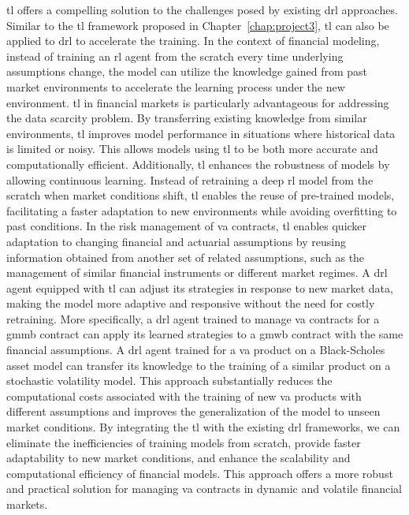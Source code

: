 \gls{tl} offers a compelling solution to the challenges posed by existing \gls{drl} approaches. 
Similar to the \gls{tl} framework proposed in Chapter~\ref{chap:project3}, \gls{tl} can also be applied to \gls{drl} to accelerate the training.
In the context of financial modeling, instead of training an \gls{rl} agent from the scratch every time underlying assumptions change, the model can utilize the knowledge gained from past market environments to accelerate the learning process under the new environment.
\gls{tl} in financial markets is particularly advantageous for addressing the data scarcity problem. 
By transferring existing knowledge from similar environments, \gls{tl} improves model performance in situations where historical data is limited or noisy. 
This allows models using \gls{tl} to be both more accurate and computationally efficient. 
Additionally, \gls{tl} enhances the robustness of models by allowing continuous learning. 
Instead of retraining a deep \gls{rl} model from the scratch when market conditions shift, \gls{tl} enables the reuse of pre-trained models, facilitating a faster adaptation to new environments while avoiding overfitting to past conditions.
In the risk management of \gls{va} contracts, \gls{tl} enables quicker adaptation to changing financial and actuarial assumptions by reusing information obtained from another set of related assumptions, such as the management of similar financial instruments or different market regimes. 
A \gls{drl} agent equipped with \gls{tl} can adjust its strategies in response to new market data, making the model more adaptive and responsive without the need for costly retraining.
More specifically, a \gls{drl} agent trained to manage \gls{va} contracts for a \gls{gmmb} contract can apply its learned strategies to a \gls{gmwb} contract with the same financial assumptions. 
A \gls{drl} agent trained for a \gls{va} product on a Black-Scholes asset model can transfer its knowledge to the training of a similar product on a stochastic volatility model.
This approach substantially reduces the computational costs associated with the training of new \gls{va} products with different assumptions and improves the generalization of the model to unseen market conditions.
By integrating the \gls{tl} with the existing \gls{drl} frameworks, we can eliminate the inefficiencies of training models from scratch, provide faster adaptability to new market conditions, and enhance the scalability and computational efficiency of financial models. 
This approach offers a more robust and practical solution for managing \gls{va} contracts in dynamic and volatile financial markets.

